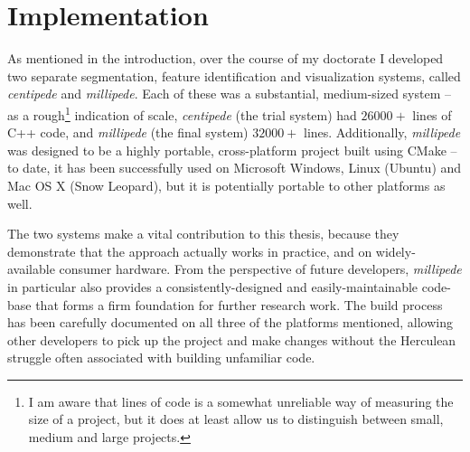 \section{Implementation}

As mentioned in the introduction, over the course of my doctorate I developed two separate segmentation, feature identification and visualization systems, called \emph{centipede} and \emph{millipede}. Each of these was a substantial, medium-sized system -- as a rough\footnote{I am aware that lines of code is a somewhat unreliable way of measuring the size of a project, but it does at least allow us to distinguish between small, medium and large projects.} indication of scale, \emph{centipede} (the trial system) had $26000+$ lines of C++ code, and \emph{millipede} (the final system) $32000+$ lines. Additionally, \emph{millipede} was designed to be a highly portable, cross-platform project built using CMake -- to date, it has been successfully used on Microsoft Windows, Linux (Ubuntu) and Mac OS X (Snow Leopard), but it is potentially portable to other platforms as well.

The two systems make a vital contribution to this thesis, because they demonstrate that the approach actually works in practice, and on widely-available consumer hardware. From the perspective of future developers, \emph{millipede} in particular also provides a consistently-designed and easily-maintainable code-base that forms a firm foundation for further research work. The build process has been carefully documented on all three of the platforms mentioned, allowing other developers to pick up the project and make changes without the Herculean struggle often associated with building unfamiliar code.

